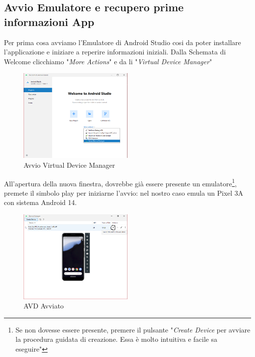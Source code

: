 \documentclass{article}
\begin{document}
\subsection{Avvio Emulatore e recupero prime informazioni App}
Per prima cosa avviamo l'Emulatore di Android Studio cosi da poter installare l'applicazione e iniziare a reperire informazioni iniziali. 
Dalla Schemata di Welcome clicchiamo "\textit{More Actions}" e da li "\textit{Virtual Device Manager}"
\begin{figure}[h]
  \centering
  \includegraphics[width=0.5\textwidth]{./insecureshop/andStudDevice.png}
  \captionsetup{labelformat=empty}
  \caption{Avvio Virtual Device Manager}
  \label{fig:VDMStart}
\end{figure}

All'apertura della nuova finestra, dovrebbe già essere presente un emulatore\footnote{Se non dovesse essere presente, premere il pulsante 
"\textit{Create Device} per avviare la procedura guidata di creazione. Essa è molto intuitiva e facile sa eseguire"}, premete il simbolo play per 
iniziarne l'avvio: nel nostro caso emula un Pixel 3A con sistema Android 14.
\begin{figure}[h]
    \centering
    \includegraphics[width=0.5\textwidth]{./insecureshop/avvioADV.png}
    \captionsetup{labelformat=empty}
    \caption{AVD Avviato}
    \label{fig:avvioPhone}
\end{figure}
\end{document}

